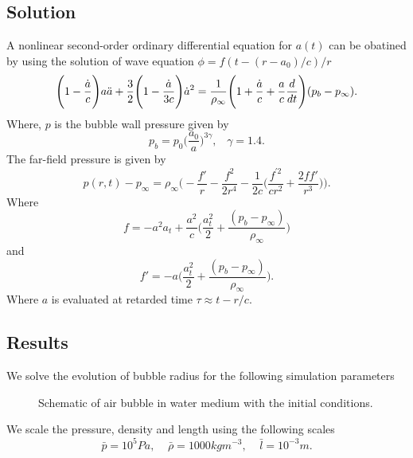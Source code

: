 \documentclass[a4paper]{article}
\begin{document}
\subsection*{Solution}
A nonlinear second-order ordinary differential equation for $a(t)$ can be obatined by using the solution of wave equation $\phi = f(t - (r - a_0)/c)/r$
\begin{equation}
    \Bigg( 1 - \frac{\Dot{a}}{c} \Bigg)a \Ddot{a} + \frac{3}{2} \Bigg(1 - \frac{\Dot{a}}{3c} \Bigg)\Dot{a}^2 = \frac{1}{\rho_\infty} \Bigg( 1 + \frac{\Dot{a}}{c} + \frac{a}{c}\frac{d}{dt}\Bigg)(p_b - p_\infty).
\end{equation}
Where,  $p$ is the bubble wall pressure given by
\begin{equation}
    p_b = p_{0} \Bigg( \frac{a_0}{a} \Bigg)^{3 \gamma}, \;\;\; \gamma = 1.4.
\end{equation}
The far-field pressure is given by
\begin{equation}
    p(r, t) - p_{\infty} = \rho_\infty\Big( -\frac{f'}{r} -\frac{f^2}{2r^4} - \frac{1}{2c} \Big( \frac{f^{'2}}{cr^2} + \frac{2ff'}{r^3}   \Big) \Big ).
\end{equation}
Where
\begin{equation}
    f = -a^2 a_t + \frac{a^2}{c}\Big( \frac{a_t^2}{2} + \frac{(p_b - p_\infty)}{\rho_\infty}\Big)
\end{equation}
and
\begin{equation}
    f' = -a\Big( \frac{a_t^2}{2} + \frac{(p_b - p_\infty)}{\rho_\infty} \Big).
\end{equation}
Where $a$ is evaluated at retarded time $\tau \approx t - r/c$.
\subsection*{Results}
We solve the evolution of bubble radius for the following simulation parameters
\begin{figure}[!h]
    \centering
    \caption{Schematic of air bubble in water medium with the initial conditions.}
\end{figure}
We scale the pressure, density and length using the following scales
\begin{equation}
    \bar{p} = 10^5Pa, \;\;\;\; \bar{\rho} = 1000 kgm^{-3}, \;\;\;\; \bar{l} = 10^{-3} m.
\end{equation}
\end{document}
